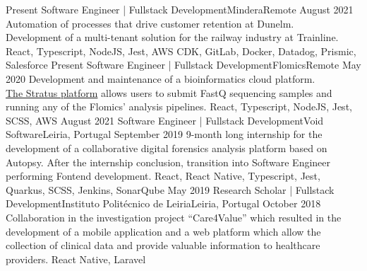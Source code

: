 %
%
%
\begin{experiences}
  \experience
    {Present}   {Software Engineer | Fullstack Development}{Mindera}{Remote}
    {August 2021} {Automation of processes that drive customer retention at Dunelm.\\
                  Development of a multi-tenant solution for the railway industry at Trainline.}
                  {React, Typescript, NodeJS, Jest, AWS CDK, GitLab, Docker, Datadog, Prismic, Salesforce}
  \emptySeparator
  \experience
    {Present} {Software Engineer | Fullstack Development}{Flomics}{Remote}
    {May 2020}    {Development and maintenance of a bioinformatics cloud platform.\\
                  \href{https://cloud.flomics.com}{The Stratus platform} allows users to submit FastQ sequencing samples and running any of the Flomics' analysis pipelines.}
                  {React, Typescript, NodeJS, Jest, SCSS, AWS}
  \emptySeparator
  \experience
    {August 2021}     {Software Engineer | Fullstack Development}{Void Software}{Leiria, Portugal}
    {September 2019}    {9-month long internship for the development of a collaborative digital forensics analysis
                          platform based on Autopsy.
                          After the internship conclusion, transition into Software Engineer
                          performing Fontend development.}
                  {React, React Native, Typescript, Jest, Quarkus, SCSS, Jenkins, SonarQube}
  \emptySeparator
  \emptySeparator
  \experience
    {May 2019}     {Research Scholar | Fullstack Development}{Instituto Politécnico de Leiria}{Leiria, Portugal}
    {October 2018}    {Collaboration in the investigation project “Care4Value” which resulted in
                        the development of a mobile application and a web platform which allow
                        the collection of clinical data and provide valuable information to
                        healthcare providers.}
                    {React Native, Laravel}
  \emptySeparator
\end{experiences}
